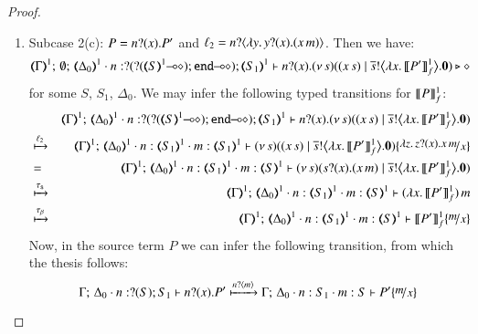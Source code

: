 \begin{proof}
\begin{enumerate}[1.]
	\item	Subcase 2(c): $P = n ? (x) . P'$ and $\ell_2 = n ? \langle \lambda y.\,y ? (x) . (x\, {m}) \rangle$.
		Then we have:
%
		\[
			\mapt{\Gamma}^{1};\, \emptyset;\, \mapt{\Delta_0}^{1} \cat 
			n: \btinp{\lhot{\btinp{\lhot{\tmap{S}{1}}}\tinact}} \tmap{S_1}{1}
			\proves
			\binp{n}{x} \newsp{s}{(\appl{x}{s})
			\Par 
			\bbout{\dual{s}}{\abs{x}{\pmapp{P'}{1}{f}}} \inact}
			\hastype \Proc
		\]
%
		for some $S$, $S_1$, $\Delta_0$.
		We may infer the following typed transitions for $\llbracket P\rrbracket^1_f$:
%
		\begin{eqnarray*}
			& & 
			\mapt{\Gamma}^{1};\, %
			\mapt{\Delta_0}^{1} \cat 
			n: \btinp{\lhot{\btinp{\lhot{\tmap{S}{1}}}\tinact}} \tmap{S_1}{1}
			\proves
			\binp{n}{x} \newsp{s}{(\appl{x}{s}) 
							\Par 
							\bbout{\dual{s}}{\abs{x}{\pmapp{P'}{1}{f}}} \inact} \\
			& \hby{\ell_2} & 
			\mapt{\Gamma}^{1};\, %
			\mapt{\Delta_0}^{1} \cat 
			n:\tmap{S_1}{1}
			\cat m:\tmap{S_1}{1}
			\proves
			\newsp{s}{(\appl{x}{s}) 
				\Par 
				\bbout{\dual{s}}{\abs{x}{\pmapp{P'}{1}{f}}} \inact} \subst{\abs{z}\binp{z}{x}\appl{x}{m}}{x} \\
			& = & 
			\mapt{\Gamma}^{1};\, %
			\mapt{\Delta_0}^{1} 
			\cat n:\tmap{S_1}{1}
			\cat m:\tmap{S}{1}
			\proves
			\newsp{s}{\binp{s}{x}(\appl{x}{m}) 
				\Par 
				\bbout{\dual{s}}{\abs{x}{\pmapp{P'}{1}{f}}} \inact}  \\
			& \hby{\stau} & 
			\mapt{\Gamma}^{1};\, %
			\mapt{\Delta_0}^{1} 
			\cat n:\tmap{S_1}{1}
			\cat m:\tmap{S}{1}
			\proves
			\appl{(\abs{x}{\pmapp{P'}{1}{f}})}{m}   \\
			& \hby{\btau} & 
			\mapt{\Gamma}^{1};\, %
			\mapt{\Delta_0}^{1} 
			\cat n:\tmap{S_1}{1}
			\cat m:\tmap{S}{1}
			\proves
			\pmapp{P'}{1}{f}\subst{m}{x}   
		\end{eqnarray*}
%
		Now, in the source term $P$ we can infer the following transition, from which the thesis follows:
%
		\[
			\Gamma;\,  \Delta_0 \cat n:\btinp{S} S_1 \proves \binp{n}{x} P'
			\hby{\bactinp{n}{m}} 
			\Gamma;\,  \Delta_0 \cat n: S_1 \cat m: S \proves P'\subst{m}{x}
		\]
\end{enumerate}
\end{proof}




